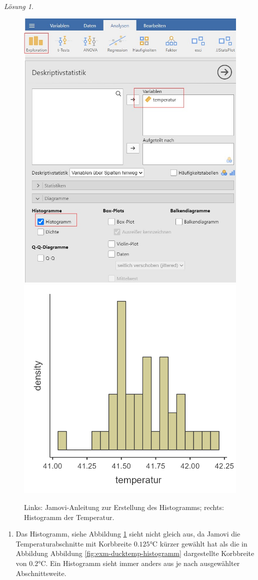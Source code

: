 \documentclass[
]{book}
\providecommand{\tightlist}{%
  \setlength{\itemsep}{0pt}\setlength{\parskip}{0pt}}
\theoremstyle{definition}
\theoremstyle{definition}
\theoremstyle{definition}
\theoremstyle{definition}
\theoremstyle{remark}
\newtheorem*{solution}{Lösung}
\begin{document}
\begin{solution}
\leavevmode

\begin{figure}
  
  {\centering \includegraphics[width=0.5\linewidth]{figures/Enten_n40_instr_histogramm} \includegraphics[width=0.5\linewidth]{figures/Enten_n40} 
  
  }
  
  \caption{Links: Jamovi-Anleitung zur Erstellung des Histogramms; rechts: Histogramm der Temperatur.}\label{fig:enten-hist-mean-sd1}
  \end{figure}

\begin{enumerate}
\def\labelenumi{(\alph{enumi})}
\tightlist
\item
  Das Histogramm, siehe Abbildung \ref{fig:enten-hist-mean-sd1} sieht nicht gleich aus, da Jamovi die Temperaturabschnitte mit Korbbreite \(0.125\)°C kürzer gewählt hat als die in Abbildung Abbildung \ref{fig:exm-ducktemp-histogramm} dargestellte Korbbreite von \(0.2\)°C. Ein Histogramm sieht immer anders aus je nach ausgewählter Abschnittsweite.
\end{enumerate}


\end{solution}
\end{document}
